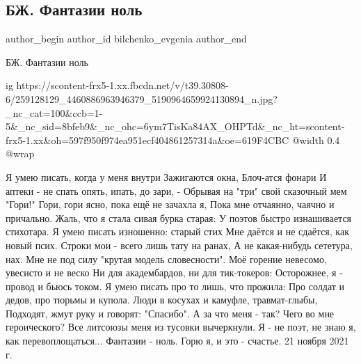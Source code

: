  
 
 
 
 
 
\subsection{БЖ. Фантазии ноль}
\label{sec:21_11_2021.fb.bilchenko_evgenia.3.fantazii_nolj}
 
\ifcmt
 author_begin
   author_id bilchenko_evgenia
 author_end
\fi

БЖ. Фантазии ноль

\ifcmt
  ig https://scontent-frx5-1.xx.fbcdn.net/v/t39.30808-6/259128129_4460886963946379_5190964659924130894_n.jpg?_nc_cat=100&ccb=1-5&_nc_sid=8bfeb9&_nc_ohc=6ym7TisKa84AX_OHPTd&_nc_ht=scontent-frx5-1.xx&oh=597f950f974ea951ecf404861257314a&oe=619F4CBC
  @width 0.4
  @wrap 
\fi

\begin{multicols}{2}
\obeycr
Я умею писать, когда у меня внутри
Зажигаются окна, Блоч-атся фонари
И аптеки - не спать опять, ипать, до зари, -
Обрывая на "три" свой сказочный мем "Гори!"
\smallskip
Гори, гори ясно, пока ещё не зачахла я,
Пока мне отчаянно, чаячно и причально.
Жаль, что я стала сивая бурка старая:
У поэтов быстро изнашивается стихотара.
\smallskip
Я умею писать изношенно: старый стих
Мне даётся и не сдаётся, как новый псих.
Строки мои - всего лишь тату на ранах,
А не какая-нибудь сететура, нах.
\smallskip
Мне не под силу "крутая модель словесности".
Моё горение невесомо, увесисто и не веско
Ни для академбардов, ни для тик-токеров:
Осторожнее, я - провод и бьюсь током.
\smallskip
Я умею писать про то лишь, что прожила:
Про солдат и дедов, про тюрьмы и купола.
Люди в косухах и камуфле, травмат-глыбы,
Подходят, жмут руку и говорят: "Спасибо".
\smallskip
А за что меня - так? Чего во мне героического?
Все литсоюзы меня из тусовки вычеркнули.
Я - не поэт, не знаю я, как перевоплощаться...
\smallskip
Фантазии - ноль. 
Горю я, и это - счастье.
21 ноября 2021 г.
\restorecr
\end{multicols}
